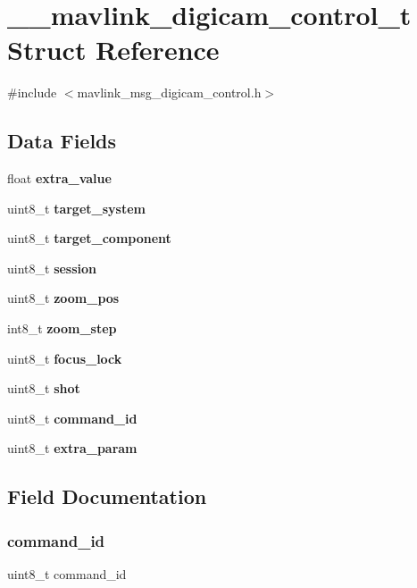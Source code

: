 \section{\+\_\+\+\_\+mavlink\+\_\+digicam\+\_\+control\+\_\+t Struct Reference}
\label{struct____mavlink__digicam__control__t}


{\ttfamily \#include $<$mavlink\+\_\+msg\+\_\+digicam\+\_\+control.\+h$>$}

\subsection*{Data Fields}
\begin{DoxyCompactItemize}
\item 
float \textbf{ extra\+\_\+value}
\item 
uint8\+\_\+t \textbf{ target\+\_\+system}
\item 
uint8\+\_\+t \textbf{ target\+\_\+component}
\item 
uint8\+\_\+t \textbf{ session}
\item 
uint8\+\_\+t \textbf{ zoom\+\_\+pos}
\item 
int8\+\_\+t \textbf{ zoom\+\_\+step}
\item 
uint8\+\_\+t \textbf{ focus\+\_\+lock}
\item 
uint8\+\_\+t \textbf{ shot}
\item 
uint8\+\_\+t \textbf{ command\+\_\+id}
\item 
uint8\+\_\+t \textbf{ extra\+\_\+param}
\end{DoxyCompactItemize}


\subsection{Field Documentation}
\mbox{\label{struct____mavlink__digicam__control__t_a3c881a6d06732ecad995c604b724f32e}} 
\subsubsection{command\+\_\+id}
{\footnotesize\ttfamily uint8\+\_\+t command\+\_\+id}

